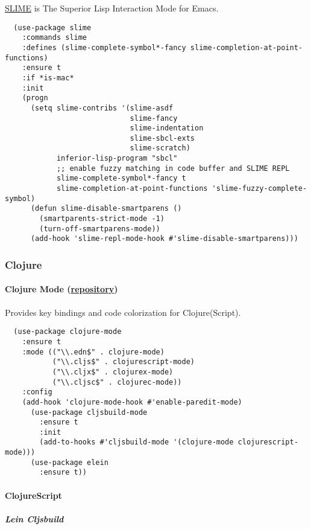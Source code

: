 \documentclass[11pt]{article}
\begin{document}
\href{https://common-lisp.net/project/slime/}{SLIME} is The Superior Lisp Interaction Mode for Emacs.

\begin{verbatim}
  (use-package slime
    :commands slime
    :defines (slime-complete-symbol*-fancy slime-completion-at-point-functions)
    :ensure t
    :if *is-mac*
    :init
    (progn
      (setq slime-contribs '(slime-asdf
                             slime-fancy
                             slime-indentation
                             slime-sbcl-exts
                             slime-scratch)
            inferior-lisp-program "sbcl"
            ;; enable fuzzy matching in code buffer and SLIME REPL
            slime-complete-symbol*-fancy t
            slime-completion-at-point-functions 'slime-fuzzy-complete-symbol)
      (defun slime-disable-smartparens ()
        (smartparents-strict-mode -1)
        (turn-off-smartparens-mode))
      (add-hook 'slime-repl-mode-hook #'slime-disable-smartparens)))
\end{verbatim}
\subsubsection*{Clojure}
\label{sec:org96fec5d}
\paragraph*{Clojure Mode (\href{https://gihub.com/clojure-emacs/clojure-mode}{repository})}
\label{sec:org9356563}

Provides key bindings and code colorization for Clojure(Script).

\begin{verbatim}
  (use-package clojure-mode
    :ensure t
    :mode (("\\.edn$" . clojure-mode)
           ("\\.cljs$" . clojurescript-mode)
           ("\\.cljx$" . clojurex-mode)
           ("\\.cljsc$" . clojurec-mode))
    :config
    (add-hook 'clojure-mode-hook #'enable-paredit-mode)
      (use-package cljsbuild-mode
        :ensure t
        :init
        (add-to-hooks #'cljsbuild-mode '(clojure-mode clojurescript-mode)))
      (use-package elein
        :ensure t))
\end{verbatim}

\paragraph*{ClojureScript}
\label{sec:org3e47482}
\subparagraph*{Lein Cljsbuild}
\label{sec:org8074c38}
\end{document}
